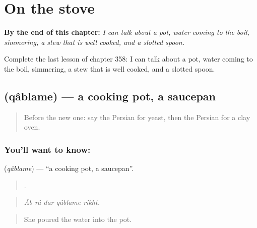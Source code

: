 
\chapter{On the stove}
\label{ch:fa-on-the-stove}

\begin{chapteropening}
\textbf{By the end of this chapter:} \emph{I can talk about a pot, water coming to the boil, simmering, a stew that is well cooked, and a slotted spoon.}

Complete the last lesson of chapter 358: I can talk about a pot, water coming to the boil, simmering, a stew that is well cooked, and a slotted spoon.
\end{chapteropening}

\section[\texorpdfstring{\fa{قابلمه} (qâblame)}{قابلمه (qâblame)}]{ (qâblame) — a cooking pot, a saucepan}

\label{lesson:FA-C358-qablame}



\begin{quote}
Before the new one: say the Persian for yeast, then the Persian for a clay oven.
\end{quote}

\subsection*{You'll want to know: }
\textbf{} (\emph{qâblame}) — \textquotedblleft{}a cooking pot, a saucepan\textquotedblright{}.

\begin{quote}
    .
\end{quote}

\begin{quote}
\emph{Âb râ dar qâblame rikht.}
\end{quote}

\begin{quote}
She poured the water into the pot.
\end{quote}

